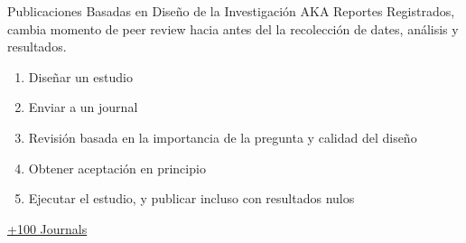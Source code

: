 \documentclass{beamer}
\begin{document}
{ %
    \begin{frame}[plain, label=AEAreg]
     \end{frame}
}

\begin{frame}{Publicaciones Basadas en Diseño de la Investigación}
AKA Reportes Registrados, cambia momento de peer review hacia antes del la recolección de dates, análisis y resultados. 

\begin{enumerate}[<.->]
\item Diseñar un estudio
\item Enviar a un journal
\item Revisión basada en la importancia de la pregunta y calidad del diseño
\item Obtener aceptación en principio
\item Ejecutar el estudio, y publicar incluso con resultados nulos
\end{enumerate}
\href{https://osf.io/8mpji/wiki/home/}{+100 Journals  }
\end{frame}
\end{document}
